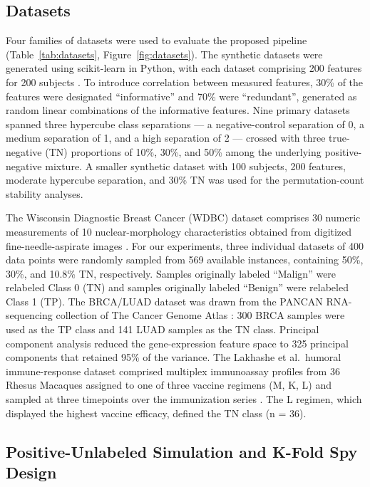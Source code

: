 \documentclass[11pt]{article}
\begin{document}
\subsection{Datasets}

Four families of datasets were used to evaluate the proposed pipeline (Table~\ref{tab:datasets}, Figure~\ref{fig:datasets}). The synthetic datasets were generated using scikit-learn in Python, with each dataset comprising 200 features for 200 subjects \cite{pedregosa2011scikit}. To introduce correlation between measured features, 30\% of the features were designated ``informative'' and 70\% were ``redundant'', generated as random linear combinations of the informative features. Nine primary datasets spanned three hypercube class separations --- a negative-control separation of 0, a medium separation of 1, and a high separation of 2 --- crossed with three true-negative (TN) proportions of 10\%, 30\%, and 50\% among the underlying positive-negative mixture. A smaller synthetic dataset with 100 subjects, 200 features, moderate hypercube separation, and 30\% TN was used for the permutation-count stability analyses.

The Wisconsin Diagnostic Breast Cancer (WDBC) dataset comprises 30 numeric measurements of 10 nuclear-morphology characteristics obtained from digitized fine-needle-aspirate images \cite{wolberg1999nuclear,wolberg2002computer}. For our experiments, three individual datasets of 400 data points were randomly sampled from 569 available instances, containing 50\%, 30\%, and 10.8\% TN, respectively. Samples originally labeled ``Malign'' were relabeled Class 0 (TN) and samples originally labeled ``Benign'' were relabeled Class 1 (TP). The BRCA/LUAD dataset was drawn from the PANCAN RNA-sequencing collection of The Cancer Genome Atlas \cite{weinstein2013tcga}: 300 BRCA samples were used as the TP class and 141 LUAD samples as the TN class. Principal component analysis reduced the gene-expression feature space to 325 principal components that retained 95\% of the variance. The Lakhashe et al.\ humoral immune-response dataset comprised multiplex immunoassay profiles from 36 Rhesus Macaques assigned to one of three vaccine regimens (M, K, L) and sampled at three timepoints over the immunization series \cite{lakhashe2022virosomal,marasini2021enshivig,malherbe2021adenovirus}. The L regimen, which displayed the highest vaccine efficacy, defined the TN class (n = 36).

\subsection{Positive-Unlabeled Simulation and K-Fold Spy Design}
\end{document}
